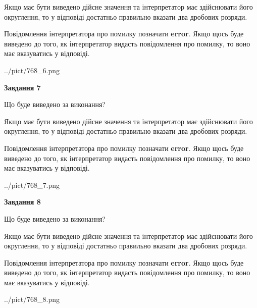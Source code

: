 \documentclass[12pt, ukrainian]{article}
\begin{document}
{\begin {Large}
Якщо має бути виведено дійсне значення та інтерпретатор має здійснювати його округлення, 
то у відповіді достатньо правильно вказати два дробових розряди.

Повідомлення інтерпретатора про помилку позначати \textbf{error}.
Якщо щось буде виведено до того, як інтерпретатор видасть повідомлення про помилку, 
то воно має вказуватись у відповіді. \par

\begin{center}
	{../pict/768_6.png}
\end{center}
\newpage

{\begin {center}\textbf{Завдання 7}\end {center}}\par
Що буде виведено за виконання? \par

Якщо має бути виведено дійсне значення та інтерпретатор має здійснювати його округлення, 
то у відповіді достатньо правильно вказати два дробових розряди.

Повідомлення інтерпретатора про помилку позначати \textbf{error}.
Якщо щось буде виведено до того, як інтерпретатор видасть повідомлення про помилку, 
то воно має вказуватись у відповіді. \par

\begin{center}
	{../pict/768_7.png}
\end{center}
\newpage

{\begin {center}\textbf{Завдання 8}\end {center}}\par
Що буде виведено за виконання? \par

Якщо має бути виведено дійсне значення та інтерпретатор має здійснювати його округлення, 
то у відповіді достатньо правильно вказати два дробових розряди.

Повідомлення інтерпретатора про помилку позначати \textbf{error}.
Якщо щось буде виведено до того, як інтерпретатор видасть повідомлення про помилку, 
то воно має вказуватись у відповіді. \par

\begin{center}
	{../pict/768_8.png}
\end{center}
\newpage


\end{Large}}
\end{document}
